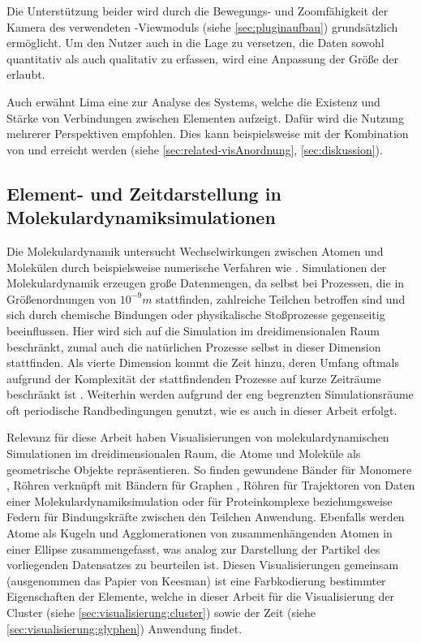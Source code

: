 Die Unterstützung beider  wird durch die Bewegungs- und Zoomfähigkeit der Kamera des verwendeten -Viewmoduls (siehe \autoref{sec:pluginaufbau}) grundsätzlich ermöglicht. Um den Nutzer auch in die Lage zu versetzen, die Daten sowohl quantitativ als auch qualitativ zu erfassen, wird eine Anpassung der Größe der  erlaubt.

Auch erwähnt Lima eine  zur Analyse des Systems, welche die Existenz und Stärke von Verbindungen zwischen Elementen aufzeigt. Dafür wird die Nutzung mehrerer Perspektiven empfohlen. Dies kann beispielsweise mit der Kombination von  und  erreicht werden (siehe \autoref{sec:related-visAnordnung}, \autoref{sec:diskussion}). %

\subsection*{Element- und Zeitdarstellung in Molekulardynamiksimulationen}

Die Molekulardynamik untersucht Wechselwirkungen zwischen Atomen und Molekülen durch beispielsweise numerische Verfahren wie . Simulationen der Molekulardynamik erzeugen große Datenmengen, da selbst bei Prozessen, die in Größenordnungen von $10^{-9}m$ stattfinden, zahlreiche Teilchen betroffen sind und sich durch chemische Bindungen oder physikalische Stoßprozesse gegenseitig beeinflussen. Hier wird sich auf die Simulation im dreidimensionalen Raum beschränkt, zumal auch die natürlichen Prozesse selbst in dieser Dimension stattfinden. Als vierte Dimension kommt die Zeit hinzu, deren Umfang oftmals aufgrund der Komplexität der stattfindenden Prozesse auf kurze Zeiträume beschränkt ist \cite{bylaska2013extendingTimeMD}. Weiterhin werden aufgrund der eng begrenzten Simulationsräume oft periodische Randbedingungen genutzt, wie es auch in dieser Arbeit erfolgt. %

Relevanz für diese Arbeit haben Visualisierungen von molekulardynamischen Simulationen im dreidimensionalen Raum, die Atome und Moleküle als geometrische Objekte repräsentieren. So finden gewundene Bänder für Monomere \cite{cohen2007proteins}, Röhren verknüpft mit Bändern für Graphen \cite{sathe2011graphene}, Röhren für Trajektoren von Daten einer Molekulardynamiksimulation \cite{grottel2014trajectories} oder für Proteinkomplexe \cite{small2013ribosomal} \cite{cao2013cancer} beziehungsweise Federn für Bindungskräfte zwischen den Teilchen \cite{keesman2013springs} \cite{mcBride2013pathIntegral_web} Anwendung. Ebenfalls werden \cite{vis07grottel} Atome als Kugeln und Agglomerationen von zusammenhängenden Atomen in einer Ellipse zusammengefasst, was analog zur Darstellung der Partikel des vorliegenden Datensatzes zu beurteilen ist. Diesen Visualisierungen gemeinsam (ausgenommen das Papier von Keesman) ist eine Farbkodierung bestimmter Eigenschaften der Elemente, welche in dieser Arbeit für die Visualisierung der Cluster (siehe \autoref{sec:visualisierung:cluster}) sowie der Zeit (siehe \autoref{sec:visualisierung:glyphen}) Anwendung findet.

